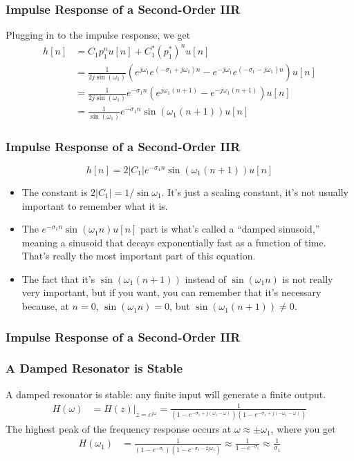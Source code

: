 \documentclass{beamer}
\begin{document}
\begin{frame}
  \frametitle{Impulse Response of a Second-Order IIR}

  Plugging in to the impulse response, we get
  \begin{align*}
    h[n] &= C_1p_1^n u[n] + C_1^* (p_1^*)^n u[n]\\
    &=\frac{1}{2j\sin(\omega_1)}
    \left(e^{j\omega_1}e^{(-\sigma_1+j\omega_1)n}-e^{-j\omega_1}e^{(-\sigma_1-j\omega_1)n}\right)u[n]\\
    &= \frac{1}{2j\sin(\omega_1)}e^{-\sigma_1n}\left(e^{j\omega_1(n+1)}-e^{-j\omega_1(n+1)}\right)u[n]\\
    &= \frac{1}{\sin(\omega_1)} e^{-\sigma_1n}\sin(\omega_1(n+1)) u[n]
  \end{align*}
\end{frame}

\begin{frame}
  \frametitle{Impulse Response of a Second-Order IIR}

  \[
  h[n] = 2|C_1| e^{-\sigma_1n}\sin(\omega_1(n+1)) u[n]
  \]
  \begin{itemize}
  \item The constant is $2|C_1|=1/\sin\omega_1$.  It's just a scaling  constant,
    it's not usually important to remember what it is.
  \item The $e^{-\sigma_1 n}\sin(\omega_1 n)u[n]$ part is what's
    called a ``damped sinusoid,'' meaning a sinusoid that decays exponentially fast
    as a function of time.  That's really the most important  part of this equation.
  \item The fact that it's $\sin(\omega_1(n+1))$ instead of $\sin(\omega_1 n)$ is
    not really very important, but if you want, you can remember that it's necessary
    because, at $n=0$, $\sin(\omega_1 n)=0$, but $\sin(\omega_1(n+1))\ne 0$.
  \end{itemize}
\end{frame}

\begin{frame}
  \frametitle{Impulse Response of a Second-Order IIR}
  
  \centerline{}
\end{frame}

\begin{frame}
  \frametitle{A Damped Resonator is Stable}

  A damped resonator is stable: any finite input will generate a
  finite output.  
  \begin{align*}
    H(\omega) &= H(z)\vert_{z=e^{j\omega}} = \frac{1}{(1-e^{-\sigma_1+j(\omega_1-\omega)})(1-e^{-\sigma_1+j(-\omega_1-\omega)})}
  \end{align*}
  The highest peak of the frequency response occurs at $\omega\approx\pm\omega_1$,
  where you get
  \begin{align*}
    H(\omega_1) &= \frac{1}{(1-e^{-\sigma_1})(1-e^{-\sigma_1-2j\omega_1})}\approx
    \frac{1}{1-e^{-\sigma_1}}\approx \frac{1}{\sigma_1}
  \end{align*}
\end{frame}
\end{document}
